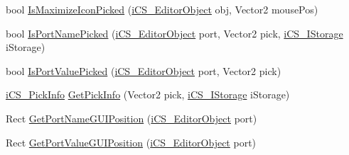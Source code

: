 \begin{DoxyCompactItemize}
bool \hyperlink{classi_c_s___graphics_a8f7dc6c63cf1eb31a4717f7209250aad}{Is\+Maximize\+Icon\+Picked} (\hyperlink{classi_c_s___editor_object}{i\+C\+S\+\_\+\+Editor\+Object} obj, Vector2 mouse\+Pos)
\item 
bool \hyperlink{classi_c_s___graphics_aea8cba821c4e7a8ce2e2aa1d86b625a0}{Is\+Port\+Name\+Picked} (\hyperlink{classi_c_s___editor_object}{i\+C\+S\+\_\+\+Editor\+Object} port, Vector2 pick, \hyperlink{classi_c_s___i_storage}{i\+C\+S\+\_\+\+I\+Storage} i\+Storage)
\item 
bool \hyperlink{classi_c_s___graphics_ae290e92ecb68fbeae298e76fb24e5151}{Is\+Port\+Value\+Picked} (\hyperlink{classi_c_s___editor_object}{i\+C\+S\+\_\+\+Editor\+Object} port, Vector2 pick)
\item 
\hyperlink{classi_c_s___pick_info}{i\+C\+S\+\_\+\+Pick\+Info} \hyperlink{classi_c_s___graphics_a7408013d594514271c880e89af3794e2}{Get\+Pick\+Info} (Vector2 pick, \hyperlink{classi_c_s___i_storage}{i\+C\+S\+\_\+\+I\+Storage} i\+Storage)
\item 
Rect \hyperlink{classi_c_s___graphics_adc1d0cbf6deff3b10cd5ed155022f014}{Get\+Port\+Name\+G\+U\+I\+Position} (\hyperlink{classi_c_s___editor_object}{i\+C\+S\+\_\+\+Editor\+Object} port)
\item 
Rect \hyperlink{classi_c_s___graphics_a07c56dc0ef934a5e227dda02424cc49b}{Get\+Port\+Value\+G\+U\+I\+Position} (\hyperlink{classi_c_s___editor_object}{i\+C\+S\+\_\+\+Editor\+Object} port)
\end{DoxyCompactItemize}
